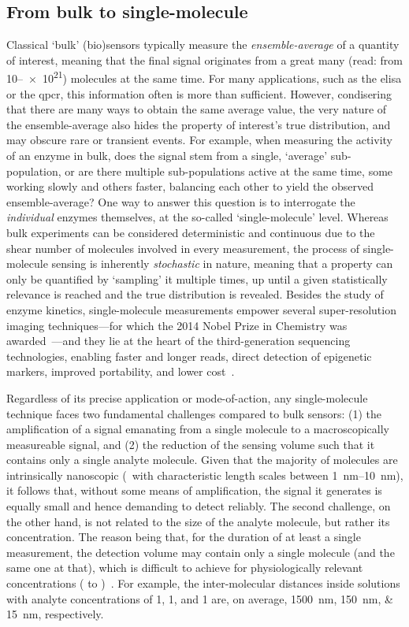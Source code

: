 \subsection{From bulk to single-molecule}

Classical `bulk' (bio)sensors typically measure the \emph{ensemble-average} of a quantity of interest, meaning
that the final signal originates from a great many (read: from \numrange{10}{e21}) molecules at the same time.
For many applications, such as the \gls{elisa} or the \gls{qpcr}, this information often is more than
sufficient. However, condisering that there are many ways to obtain the same average value, the very nature of
the ensemble-average also hides the property of interest's true distribution, and may obscure rare or
transient events. For example, when measuring the activity of an enzyme in bulk, does the signal stem from a
single, `average' sub-population, or are there multiple sub-populations active at the same time, some working
slowly and others faster, balancing each other to yield the observed ensemble-average? One way to answer this
question is to interrogate the \emph{individual} enzymes themselves, at the so-called `single-molecule' level.
Whereas bulk experiments can be considered deterministic and continuous due to the shear number of molecules
involved in every measurement, the process of single-molecule sensing is inherently \emph{stochastic} in
nature, meaning that a property can only be quantified by `sampling' it multiple times, up until a given
statistically relevance is reached and the true distribution is revealed. Besides the study of enzyme
kinetics, single-molecule measurements empower several super-resolution imaging techniques---for which the
2014 Nobel Prize in Chemistry was awarded~\cite{Weiss-2014}---and they lie at the heart of the
third-generation sequencing technologies, enabling faster and longer reads, direct detection of epigenetic
markers, improved portability, and lower cost~\cite{Schadt-2010}.

Regardless of its precise application or mode-of-action, any single-molecule technique faces two fundamental
challenges compared to bulk sensors: (1) the amplification of a signal emanating from a single molecule to a
macroscopically measureable signal, and (2) the reduction of the sensing volume such that it contains only a
single analyte molecule. Given that the majority of molecules are intrinsically nanoscopic (\ie~with
characteristic length scales between \SIrange[range-phrase= and ]{1}{10}{\nm}), it follows that, without
some means of amplification, the signal it generates is equally small and hence demanding to detect reliably.
The second challenge, on the other hand, is not related to the size of the analyte molecule, but rather its
concentration. The reason being that, for the duration of at least a single measurement, the detection volume
may contain only a single molecule (and the same one at that), which is difficult to achieve for
physiologically relevant concentrations (\si{\uM} to \si{\mM})~\cite{Zhu-2012}. For example, the
inter-molecular distances inside solutions with analyte concentrations of \SI{1}{\nM}, \SI{1}{\uM}, and
\SI{1}{\mM} are, on average, \SIlist{1500;150;15}{\nm}, respectively.



